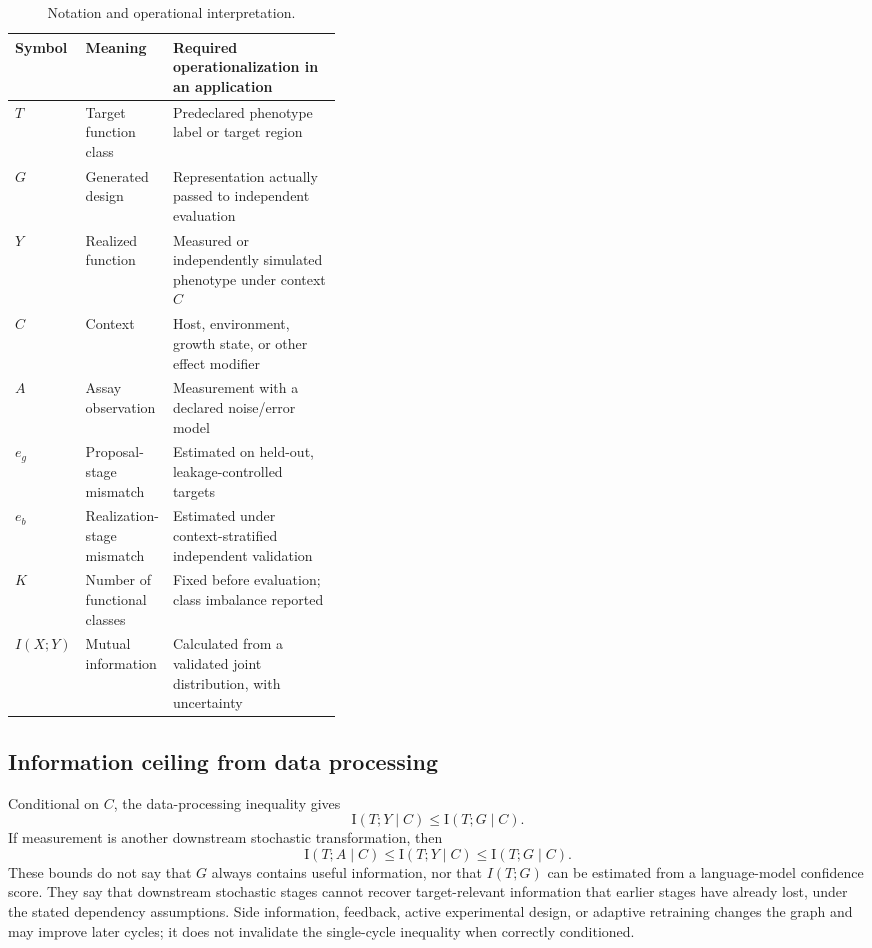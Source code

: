 \documentclass[11pt]{article}
\newcommand{\I}{\mathrm{I}}
\begin{document}
\begin{table}[H]
\centering\small
\caption{Notation and operational interpretation.}
\begin{tabularx}{\linewidth}{p{0.14\linewidth} p{0.24\linewidth} X}
\toprule
Symbol & Meaning & Required operationalization in an application \\
\midrule
$T$ & Target function class & Predeclared phenotype label or target region \\
$G$ & Generated design & Representation actually passed to independent evaluation \\
$Y$ & Realized function & Measured or independently simulated phenotype under context $C$ \\
$C$ & Context & Host, environment, growth state, or other effect modifier \\
$A$ & Assay observation & Measurement with a declared noise/error model \\
$e_g$ & Proposal-stage mismatch & Estimated on held-out, leakage-controlled targets \\
$e_b$ & Realization-stage mismatch & Estimated under context-stratified independent validation \\
$K$ & Number of functional classes & Fixed before evaluation; class imbalance reported \\
$I(X;Y)$ & Mutual information & Calculated from a validated joint distribution, with uncertainty \\
\bottomrule
\end{tabularx}
\end{table}

\subsection{Information ceiling from data processing}
Conditional on $C$, the data-processing inequality gives
\begin{equation}
\I(T;Y\mid C) \leq \I(T;G\mid C).
\label{eq:dpi}
\end{equation}
If measurement is another downstream stochastic transformation, then
\begin{equation}
\I(T;A\mid C) \leq \I(T;Y\mid C) \leq \I(T;G\mid C).
\label{eq:dpi_assay}
\end{equation}
These bounds do not say that $G$ always contains useful information, nor that $I(T;G)$ can be estimated from a language-model confidence score. They say that downstream stochastic stages cannot recover target-relevant information that earlier stages have already lost, under the stated dependency assumptions. Side information, feedback, active experimental design, or adaptive retraining changes the graph and may improve later cycles; it does not invalidate the single-cycle inequality when correctly conditioned.
\end{document}
